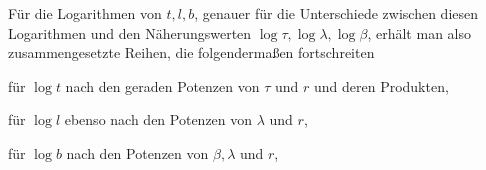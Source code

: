 \indent Für die Logarithmen von \(t,l,b\), genauer für die Unterschiede zwischen diesen Logarithmen und den Näherungswerten \(\log\tau,\log\lambda,\log\beta\), erhält man also zusammengesetzte Reihen, die folgendermaßen fortschreiten
\begin{list}{}{\setlength{\leftmargin}{1.4em}\setlength{\itemindent}{0pt}\setlength{\itemsep}{0pt}\setlength{\parsep}{0pt}}
\item für \(\log t\) nach den geraden Potenzen von \(\tau\) und \(r\) und deren Produkten,
\item für \(\log l\) ebenso nach den Potenzen von \(\lambda\) und \(r\),
\item für \(\log b\) nach den Potenzen von \(\beta,\lambda\) und \(r\),
\end{list}
